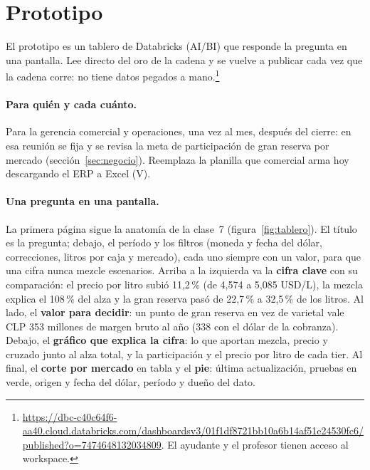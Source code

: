 \providecommand{\pend}[1]{\textcolor{red}{#1}}

\section{Prototipo}
\label{sec:prototipo}

El prototipo es un tablero de Databricks (AI/BI) que responde la pregunta en una pantalla. Lee directo del oro de la cadena y se vuelve a publicar cada vez que la cadena corre: no tiene datos pegados a mano.\footnote{\url{https://dbc-c40c64f6-aa40.cloud.databricks.com/dashboardsv3/01f1df8721bb10a6b14af51e24530fc6/published?o=7474648132034809}. El ayudante y el profesor tienen acceso al workspace.}

\paragraph{Para quién y cada cuánto.} Para la gerencia comercial y operaciones, una vez al mes, después del cierre: en esa reunión se fija y se revisa la meta de participación de gran reserva por mercado (sección~\ref{sec:negocio}). Reemplaza la planilla que comercial arma hoy descargando el ERP a Excel (V).

\paragraph{Una pregunta en una pantalla.} La primera página sigue la anatomía de la clase~7 (figura~\ref{fig:tablero}). El título es la pregunta; debajo, el período y los filtros (moneda y fecha del dólar, correcciones, litros por caja y mercado), cada uno siempre con un valor, para que una cifra nunca mezcle escenarios. Arriba a la izquierda va la \textbf{cifra clave} con su comparación: el precio por litro subió 11,2\,\% (de 4,574 a 5,085 USD/L), la mezcla explica el 108\,\% del alza y la gran reserva pasó de 22,7\,\% a 32,5\,\% de los litros. Al lado, el \textbf{valor para decidir}: un punto de gran reserva en vez de varietal vale CLP 353 millones de margen bruto al año (338 con el dólar de la cobranza). Debajo, el \textbf{gráfico que explica la cifra}: lo que aportan mezcla, precio y cruzado junto al alza total, y la participación y el precio por litro de cada tier. Al final, el \textbf{corte por mercado} en tabla y el \textbf{pie}: última actualización, pruebas en verde, origen y fecha del dólar, período y dueño del dato.

